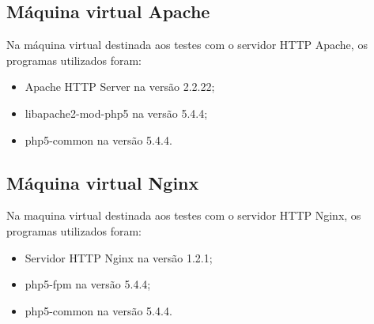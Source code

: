 \subsection{Máquina virtual Apache}
Na máquina virtual destinada aos testes com o servidor HTTP Apache, os programas utilizados foram:
\begin{itemize}
\item Apache HTTP Server na versão 2.2.22;
\item libapache2-mod-php5 na versão 5.4.4;
\item php5-common na versão 5.4.4.
\end{itemize}

\subsection{Máquina virtual Nginx}
Na maquina virtual destinada aos testes com o servidor HTTP Nginx, os programas utilizados foram:

\begin{itemize}
\item Servidor HTTP Nginx na versão 1.2.1;
\item php5-fpm na versão 5.4.4;
\item php5-common na versão 5.4.4.
\end{itemize}


